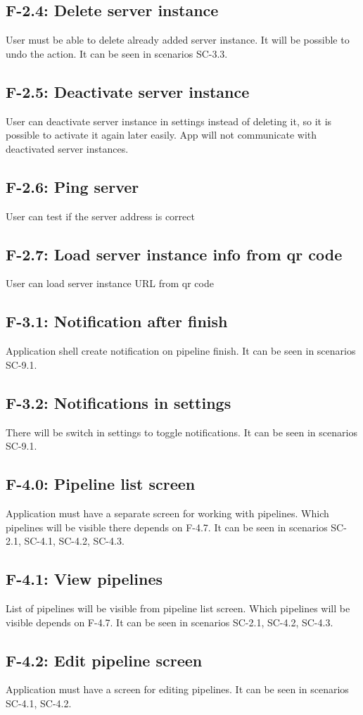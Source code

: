 \subsection*{F-2.4: Delete server instance}
User must be able to delete already added server instance. It will be possible to undo the action. It can be seen in scenarios SC-3.3.
\subsection*{F-2.5: Deactivate server instance}
User can deactivate server instance in settings instead of deleting it, so it is possible to activate it again later easily. App will not communicate with deactivated server instances.
\subsection*{F-2.6: Ping server}
User can test if the server address is correct
\subsection*{F-2.7: Load server instance info from qr code}
User can load server instance URL from qr code
\subsection*{F-3.1: Notification after finish}
Application shell create notification on pipeline finish. It can be seen in scenarios SC-9.1.
\subsection*{F-3.2: Notifications in settings}
There will be switch in settings to toggle notifications. It can be seen in scenarios SC-9.1.
\subsection*{F-4.0: Pipeline list screen}
Application must have a separate screen for working with pipelines. Which pipelines will be visible there depends on F-4.7. It can be seen in scenarios SC-2.1, SC-4.1, SC-4.2, SC-4.3.
\subsection*{F-4.1: View pipelines}
List of pipelines will be visible from pipeline list screen. Which pipelines will be visible depends on F-4.7. It can be seen in scenarios SC-2.1, SC-4.2, SC-4.3.
\subsection*{F-4.2: Edit pipeline screen}
Application must have a screen for editing pipelines. It can be seen in scenarios SC-4.1, SC-4.2.
